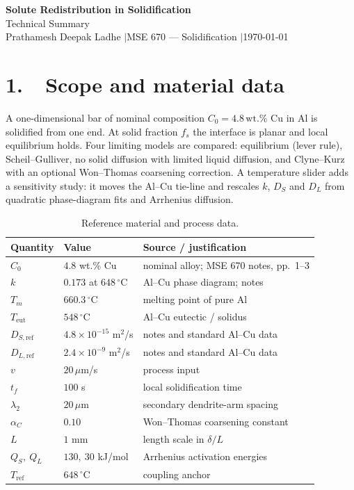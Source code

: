 \documentclass[11pt,a4paper]{article}
\newcommand{\wtpct}{\,\mathrm{wt.\%}}
\begin{document}
\begin{center}
{\Large\bfseries Solute Redistribution in Solidification}\\[2pt]
{\large Technical Summary}\\[5pt]
{\small Prathamesh Deepak Ladhe \quad$\vert$\quad MSE 670 --- Solidification
\quad$\vert$\quad \today}
\end{center}

\vspace{-0.3em}

\section*{1.\ \ Scope and material data}

A one-dimensional bar of nominal composition $C_0=4.8\wtpct$ Cu in Al is
solidified from one end. At solid fraction $f_s$ the interface is planar and
local equilibrium holds. Four limiting models are compared: equilibrium (lever
rule), Scheil--Gulliver, no solid diffusion with limited liquid diffusion, and
Clyne--Kurz with an optional Won--Thomas coarsening correction. A temperature
slider adds a sensitivity study: it moves the Al--Cu tie-line and rescales
$k$, $D_S$ and $D_L$ from quadratic phase-diagram fits and Arrhenius
diffusion.

\begin{table}[h]
\centering
\small
\begin{tabular}{@{}p{}p{}p{}@{}}
\toprule
\textbf{Quantity} & \textbf{Value} & \textbf{Source / justification}\\
\midrule
$C_0$ & $4.8$ wt.\% Cu & nominal alloy; MSE 670 notes, pp.~1--3\\
$k$ & $0.173$ at $648\,^\circ$C & Al--Cu phase diagram; notes\\
$T_m$ & $660.3\,^\circ$C & melting point of pure Al\\
$T_{\text{eut}}$ & $548\,^\circ$C & Al--Cu eutectic / solidus\\
$D_{S,\text{ref}}$ & $4.8\times10^{-15}$ m$^2$/s & notes and standard Al--Cu data\\
$D_{L,\text{ref}}$ & $2.4\times10^{-9}$ m$^2$/s & notes and standard Al--Cu data\\
$v$ & $20\,\mu$m/s & process input\\
$t_f$ & $100$ s & local solidification time\\
$\lambda_2$ & $20\,\mu$m & secondary dendrite-arm spacing\\
$\alpha_C$ & $0.10$ & Won--Thomas coarsening constant\\
$L$ & $1$ mm & length scale in $\delta/L$\\
$Q_S,\ Q_L$ & $130,\ 30$ kJ/mol & Arrhenius activation energies\\
$T_{\text{ref}}$ & $648\,^\circ$C & coupling anchor\\
\bottomrule
\end{tabular}
\caption{Reference material and process data.}
\label{tab:data}
\end{table}
\end{document}
